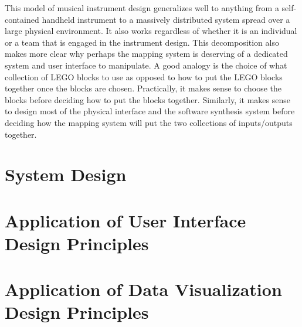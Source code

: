 This model of musical instrument design generalizes well to anything from a self-contained handheld instrument to a massively distributed system spread over a large physical environment. It also works regardless of whether it is an individual or a team that is engaged in the instrument design. This decomposition also makes more clear why perhaps the mapping system is deserving of a dedicated system and user interface to manipulate. A good analogy is the choice of what collection of LEGO blocks to use as opposed to how to put the LEGO blocks together once the blocks are chosen. Practically, it makes sense to choose the blocks before deciding how to put the blocks together. Similarly, it makes sense to design most of the physical interface and the software synthesis system before deciding how the mapping system will put the two collections of inputs/outputs together.

\section{System Design}

\section{Application of User Interface Design Principles}

\section{Application of Data Visualization Design Principles}
